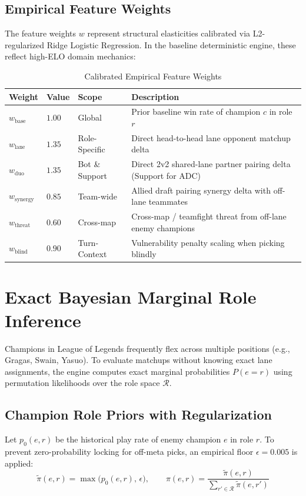 \documentclass[11pt,a4paper]{article}
\begin{document}
\subsection{Empirical Feature Weights}
The feature weights $w$ represent structural elasticities calibrated via L2-regularized Ridge Logistic Regression. In the baseline deterministic engine, these reflect high-ELO domain mechanics:

\begin{table}[h]
\centering
\caption{Calibrated Empirical Feature Weights}
\label{tab:weights}
\begin{tabular}{llll}
\toprule
\textbf{Weight} & \textbf{Value} & \textbf{Scope} & \textbf{Description} \\
\midrule
$w_{\text{base}}$ & $1.00$ & Global & Prior baseline win rate of champion $c$ in role $r$ \\
$w_{\text{lane}}$ & $1.35$ & Role-Specific & Direct head-to-head lane opponent matchup delta \\
$w_{\text{duo}}$ & $1.35$ & Bot \& Support & Direct 2v2 shared-lane partner pairing delta (Support for ADC) \\
$w_{\text{synergy}}$ & $0.85$ & Team-wide & Allied draft pairing synergy delta with off-lane teammates \\
$w_{\text{threat}}$ & $0.60$ & Cross-map & Cross-map / teamfight threat from off-lane enemy champions \\
$w_{\text{blind}}$ & $0.90$ & Turn-Context & Vulnerability penalty scaling when picking blindly \\
\bottomrule
\end{tabular}
\end{table}

\section{Exact Bayesian Marginal Role Inference}

Champions in League of Legends frequently flex across multiple positions (e.g., Gragas, Swain, Yasuo). To evaluate matchups without knowing exact lane assignments, the engine computes exact marginal probabilities $P(e = r)$ using permutation likelihoods over the role space $\mathcal{R}$.

\subsection{Champion Role Priors with Regularization}
Let $p_0(e, r)$ be the historical play rate of enemy champion $e$ in role $r$. To prevent zero-probability locking for off-meta picks, an empirical floor $\epsilon = 0.005$ is applied:
\begin{equation}
\tilde{\pi}(e, r) = \max\big(p_0(e, r),\, \epsilon\big), \qquad \pi(e, r) = \frac{\tilde{\pi}(e, r)}{\sum_{r' \in \mathcal{R}} \tilde{\pi}(e, r')}
\end{equation}
\end{document}
